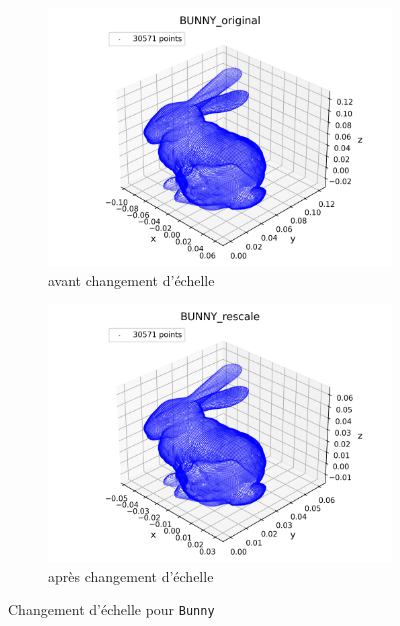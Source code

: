 \documentclass[../5RO17_TP4.tex]{subfiles}
\begin{document}
\begin{figure}[H]
    \centering
    \begin{subfigure}[b]{0.475\textwidth}
        \centering
        \includegraphics[width=\linewidth]{images/BUNNY_original.png}
        \caption{avant changement d'échelle}
        \label{}
    \end{subfigure}\hfill
    \begin{subfigure}[b]{0.475\textwidth}
        \centering
        \includegraphics[width=\linewidth]{images/BUNNY_rescale.png}
        \caption{après changement d'échelle}
        \label{}
    \end{subfigure}
    \caption{Changement d'échelle pour \texttt{Bunny}}
    \label{}
\end{figure}
\end{document}
